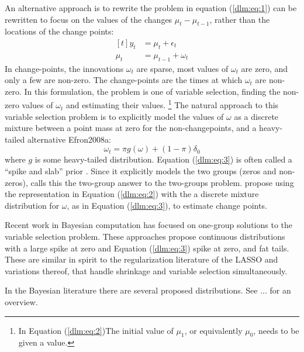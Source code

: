 An alternative approach is to rewrite the problem in equation (\ref{dlm:eq:1}) can be rewritten to focus on the values of the changes $\mu_{t} - \mu_{t - 1}$, rather than the locations of the change points:
\begin{equation}
  \label{dlm:eq:2}
  \begin{aligned}[t]
    y_{t} &= \mu_{t} + \epsilon_{t} \\
    \mu_{t} &= \mu_{t - 1} + \omega_{t}
  \end{aligned}
\end{equation}
In change-points, the innovations $\omega_{t}$ are sparse, \ie{}most values of $\omega_{t}$ are zero, and only a few are non-zero.
The change-points are the times at which $\omega_{t}$ are non-zero.
In this formulation, the problem is one of variable selection, finding the non-zero values of $\omega_{t}$ and estimating their values.
\footnote{In Equation (\ref{dlm:eq:2})The initial value of $\mu_{1}$, or equivalently $\mu_{0}$, needs to be given a value.
}
The natural approach to this variable selection problem is to explicitly model the values of $\omega$ as a discrete mixture between a point mass at zero for the non-changepoints, and a heavy-tailed alternative \textcite{MitchellBeauchamp1988a}{Efron2008a}:
\begin{equation}
  \label{dlm:eq:3}
  \omega_{t} = \pi g(\omega) + (1 - \pi) \delta_{0}
\end{equation}
where $g$ is some heavy-tailed distribution.
Equation (\ref{dlm:eq:3}) is often called a ``spike and slab'' prior \textcite{MitchellBeauchamp1988a}.
Since it explicitly models the two groups (zeros and non-zeros), \textcite{Efron2008a} calls this the two-group answer to the two-groups problem.
\textcite{GiordaniKohn2008} propose using the representation in Equation (\ref{dlm:eq:2}) with the a discrete mixture distribution for $\omega$, as in Equation (\ref{dlm:eq:3}), to estimate change points.

Recent work in Bayesian computation has focused on one-group solutions to the variable selection problem.
These approaches propose continuous distributions with a large spike at zero and    Equation (\ref{dlm:eq:3})  spike at zero, and fat tails.
These are similar in spirit to the regularization literature of the LASSO and variations thereof, that handle shrinkage and variable selection simultaneously.

In the Bayesian literature there are several proposed distributions.
See ... for an overview.

